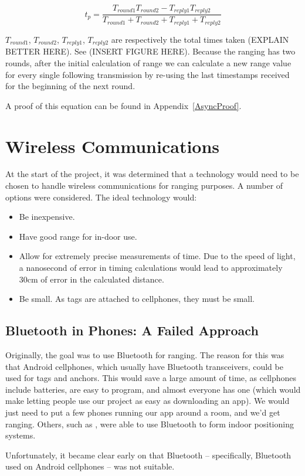 \[
	t_p = \frac{T_{round1}  T_{round2} - T_{reply1} T_{reply2}}{T_{round1} + T_{round2} + T_{reply1} + T_{reply2}}
\]

$T_{round1}$, $T_{round2}$, $T_{reply1}$, $T_{reply2}$ are respectively the total times taken (EXPLAIN BETTER HERE). See (INSERT FIGURE HERE). Because the ranging has two rounds, after the initial calculation of range we can calculate a new range value for every single following transmission by re-using the last timestamps received for the beginning of the next round.
 
A proof of this equation can be found in Appendix~\ref{AsyncProof}.

\section{Wireless Communications}
At the start of the project, it was determined that a technology would need to be chosen to handle wireless communications for ranging purposes. A number of options were considered. The ideal technology would:
\begin{itemize}
	\item Be inexpensive.
	\item Have good range for in-door use.
	\item Allow for extremely precise measurements of time. Due to the speed of light, a nanosecond of error in timing calculations would lead to approximately 30cm of error in the calculated distance.
	\item Be small. As tags are attached to cellphones, they must be small.
\end{itemize}

\subsection{Bluetooth in Phones: A Failed Approach}
Originally, the goal was to use Bluetooth for ranging. The reason for this was that Android cellphones, which usually have Bluetooth transceivers, could be used for tags and anchors. This would save a large amount of time, as cellphones include batteries, are easy to program, and almost everyone has one (which would make letting people use our project as easy as downloading an app). We would just need to put a few phones running our app around a room, and we'd get ranging. Others, such as \textcite{BluetoothIndoor}, were able to use Bluetooth to form indoor positioning systems.

Unfortunately, it became clear early on that Bluetooth -- specifically, Bluetooth used on Android cellphones -- was not suitable. 

